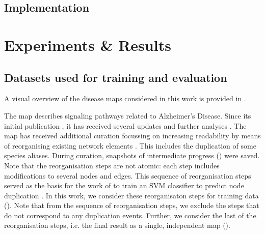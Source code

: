\documentclass[
	fontsize=10pt, %
	twoside=false, %
	secnumdepth=1, %
  toc=indentunnumbered %
]{kaobook}
\begin{document}
\section{Implementation}






% 



\chapter{Experiments \& Results}
\label{sec:experiments-results}



\section{Datasets used for training and evaluation}
\label{sec:datasets-used}

A visual overview of the disease maps considered in this work is provided in
.

The  map describes signaling pathways related to Alzheimer's
Disease. Since its initial publication
\cite{mizuno_AlzPathwayComprehensiveMap_2012}, it has received several updates
and further analyses \cite{ogishima_MapAlzheimerDiseasesignaling_2013,
  ogishima_AlzPathwayUpdatedMap_2016, mizuno_NetworkAnalysisComprehensive_2016}.
%
The map has received additional curation focussing on increasing readability by
means of reorganising existing network elements
\cite{ostaszewski_AlzPathwayRegorganisationSteps_2021}.
This includes the duplication
of some species aliases. During curation, snapshots of intermediate progress
() were saved. Note that the reorganisation steps are
not atomic: each step includes modifications to several nodes and edges.
This sequence of reorganisation steps served as the basis for the
work of \citeauthor{nielsen_MachineLearningSupport_2019} to train an SVM
classifier to predict node duplication
\cite{nielsen_MachineLearningSupport_2019}. In this work, we consider these
reorganisaton steps for training data ().
Note that from the sequence of reorganisation steps, we exclude the steps that
do not correspond to any duplication events.
Further, we consider
the last of the reorganisation steps, i.e. the final result as a single,
independent map ().
\end{document}
